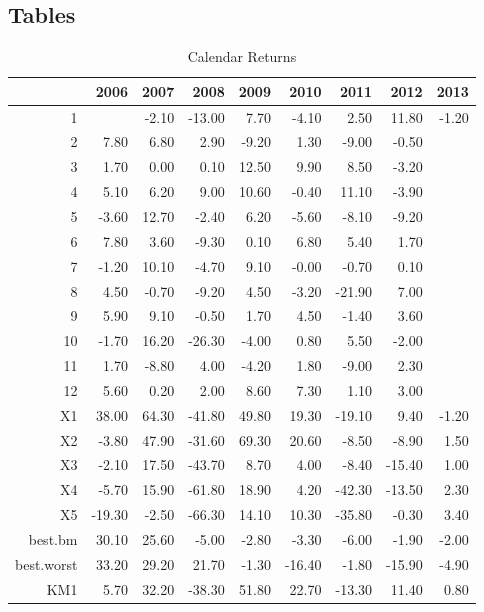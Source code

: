 \documentclass{article}
\begin{document}
\subsection{Tables}
\begin{table}[ht]
\begin{center}
\caption{Calendar Returns}
\begin{tabular}{rrrrrrrrr}
  \hline
 & 2006 & 2007 & 2008 & 2009 & 2010 & 2011 & 2012 & 2013 \\ 
  \hline
1 &  & -2.10 & -13.00 & 7.70 & -4.10 & 2.50 & 11.80 & -1.20 \\ 
  2 & 7.80 & 6.80 & 2.90 & -9.20 & 1.30 & -9.00 & -0.50 &  \\ 
  3 & 1.70 & 0.00 & 0.10 & 12.50 & 9.90 & 8.50 & -3.20 &  \\ 
  4 & 5.10 & 6.20 & 9.00 & 10.60 & -0.40 & 11.10 & -3.90 &  \\ 
  5 & -3.60 & 12.70 & -2.40 & 6.20 & -5.60 & -8.10 & -9.20 &  \\ 
  6 & 7.80 & 3.60 & -9.30 & 0.10 & 6.80 & 5.40 & 1.70 &  \\ 
  7 & -1.20 & 10.10 & -4.70 & 9.10 & -0.00 & -0.70 & 0.10 &  \\ 
  8 & 4.50 & -0.70 & -9.20 & 4.50 & -3.20 & -21.90 & 7.00 &  \\ 
  9 & 5.90 & 9.10 & -0.50 & 1.70 & 4.50 & -1.40 & 3.60 &  \\ 
  10 & -1.70 & 16.20 & -26.30 & -4.00 & 0.80 & 5.50 & -2.00 &  \\ 
  11 & 1.70 & -8.80 & 4.00 & -4.20 & 1.80 & -9.00 & 2.30 &  \\ 
  12 & 5.60 & 0.20 & 2.00 & 8.60 & 7.30 & 1.10 & 3.00 &  \\ 
  X1 & 38.00 & 64.30 & -41.80 & 49.80 & 19.30 & -19.10 & 9.40 & -1.20 \\ 
  X2 & -3.80 & 47.90 & -31.60 & 69.30 & 20.60 & -8.50 & -8.90 & 1.50 \\ 
  X3 & -2.10 & 17.50 & -43.70 & 8.70 & 4.00 & -8.40 & -15.40 & 1.00 \\ 
  X4 & -5.70 & 15.90 & -61.80 & 18.90 & 4.20 & -42.30 & -13.50 & 2.30 \\ 
  X5 & -19.30 & -2.50 & -66.30 & 14.10 & 10.30 & -35.80 & -0.30 & 3.40 \\ 
  best.bm & 30.10 & 25.60 & -5.00 & -2.80 & -3.30 & -6.00 & -1.90 & -2.00 \\ 
  best.worst & 33.20 & 29.20 & 21.70 & -1.30 & -16.40 & -1.80 & -15.90 & -4.90 \\ 
  KM1 & 5.70 & 32.20 & -38.30 & 51.80 & 22.70 & -13.30 & 11.40 & 0.80 \\ 
   \hline
\end{tabular}
\end{center}
\end{table}%
\end{document}
